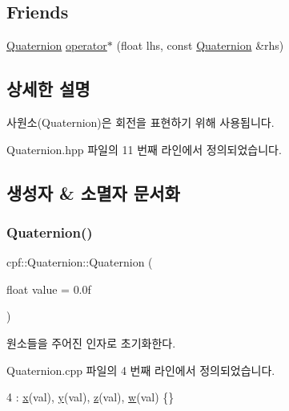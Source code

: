 \subsection*{Friends}
\begin{DoxyCompactItemize}
\item 
\hyperlink{classcpf_1_1_quaternion}{Quaternion} \hyperlink{classcpf_1_1_quaternion_ac4687317eafd9a3cfcfc56ed1af8299e}{operator$\ast$} (float lhs, const \hyperlink{classcpf_1_1_quaternion}{Quaternion} \&rhs)
\end{DoxyCompactItemize}


\subsection{상세한 설명}
사원소(\+Quaternion)은 회전을 표현하기 위해 사용됩니다. 

Quaternion.\+hpp 파일의 11 번째 라인에서 정의되었습니다.



\subsection{생성자 \& 소멸자 문서화}
\mbox{\label{classcpf_1_1_quaternion_aae3cc98fcdb7a419a29db4ee988972bc}} 
\subsubsection{\texorpdfstring{Quaternion()}{Quaternion()}\hspace{0.1cm}{\footnotesize\ttfamily [1/4]}}
{\footnotesize\ttfamily cpf\+::\+Quaternion\+::\+Quaternion (\begin{DoxyParamCaption}\item[{float}]{value = {\ttfamily 0.0f} }\end{DoxyParamCaption})}

원소들을 주어진 인자로 초기화한다. 

Quaternion.\+cpp 파일의 4 번째 라인에서 정의되었습니다.


\begin{DoxyCode}
4 : \hyperlink{classcpf_1_1_quaternion_a200f7bce4e673281af8cc7dd75cb0677}{x}(val), \hyperlink{classcpf_1_1_quaternion_a4fbade6e58be55a49c94e7f157988136}{y}(val), \hyperlink{classcpf_1_1_quaternion_ade9c41b717605118e5fdf95d96a843b4}{z}(val), \hyperlink{classcpf_1_1_quaternion_af312a196b39bb4903b876bc454ac15f8}{w}(val) \{\}
\end{DoxyCode}
\mbox{\label{classcpf_1_1_quaternion_ad50037ab0bea9e9ea33296f4ca081204}} 
